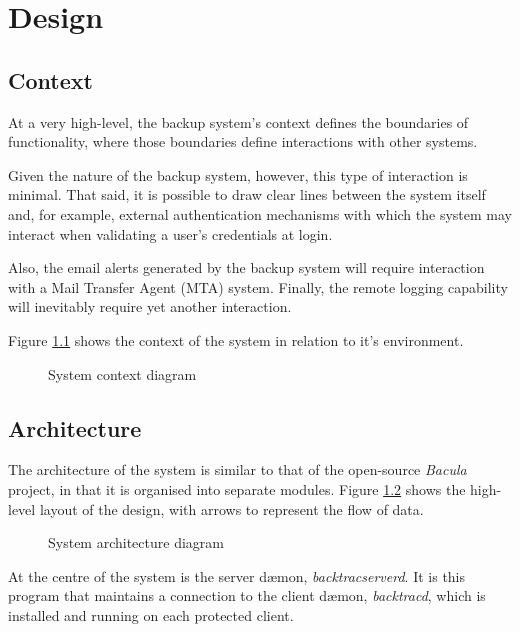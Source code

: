 \chapter{Design}

\section{Context}

At a very high-level, the backup system's context defines the boundaries of
functionality, where those boundaries define interactions with other systems.

Given the nature of the backup system, however, this type of interaction is
minimal. That said, it is possible to draw clear lines between the system
itself and, for example, external authentication mechanisms with which the
system may interact when validating a user's credentials at login.

Also, the email alerts generated by the backup system will require interaction
with a Mail Transfer Agent (MTA) system. Finally, the remote logging capability
will inevitably require yet another interaction.

Figure \ref{fig:context} shows the context of the system in relation to it's
environment.

\begin{figure}[h]
    \begin{center}
        
    \end{center}
    \caption{System context diagram}
    \label{fig:context}
\end{figure}

\section{Architecture}

The architecture of the system is similar to that of the open-source
\emph{Bacula} project, in that it is organised into separate modules. Figure
\ref{fig:architecture} shows the high-level layout of the design, with arrows
to represent the flow of data.

\begin{figure}[h]
    \begin{center}
        
    \end{center}
    \caption{System architecture diagram}
    \label{fig:architecture}
\end{figure}

At the centre of the system is the server d{\ae}mon, \emph{backtracserverd}.
It is this program that maintains a connection to the client d{\ae}mon,
\emph{backtracd}, which is installed and running on each protected client.

